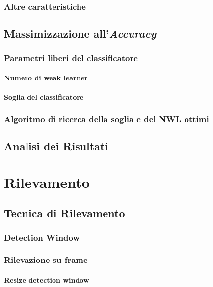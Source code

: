         \subsection{Altre caratteristiche}
    \section{Massimizzazione all'\emph{Accuracy}}
    \label{sec:accuracy_maximization}
        \subsection{Parametri liberi del classificatore}
            \subsubsection{Numero di weak learner}
            \subsubsection{Soglia del classificatore}
        \subsection{Algoritmo di ricerca della soglia e del NWL ottimi}
    \section{Analisi dei Risultati}
    \label{sec:Analisi dei Risultati}

\chapter{Rilevamento}
\label{chap:rilevamento}
    \section{Tecnica di Rilevamento}
    \label{sec:detection_tecnique}
        \subsection{Detection Window}
        \subsection{Rilevazione su frame}
            \subsubsection{Resize detection window}

